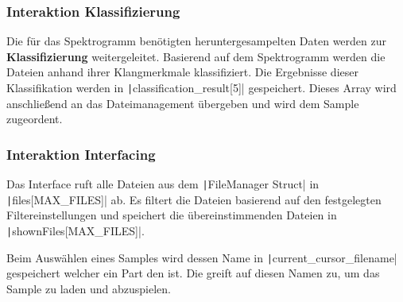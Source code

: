 \subsubsection{Interaktion Klassifizierung} 

Die für das Spektrogramm benötigten heruntergesampelten Daten werden zur \textbf{Klassifizierung} weitergeleitet. Basierend auf dem Spektrogramm werden die Dateien anhand ihrer Klangmerkmale klassifiziert. Die Ergebnisse dieser Klassifikation werden in \texttt|classification_result[5]| gespeichert. Dieses Array wird anschließend an das Dateimanagement übergeben und wird dem Sample zugeordent.

\subsubsection{Interaktion Interfacing}
 
Das Interface ruft alle Dateien aus dem \texttt|FileManager Struct| in \texttt|files[MAX_FILES]| ab. Es filtert die Dateien basierend auf den festgelegten Filtereinstellungen und speichert die übereinstimmenden Dateien in \texttt|shownFiles[MAX_FILES]|.

Beim Auswählen eines Samples wird dessen Name in \texttt|current_cursor_filename| gespeichert welcher ein Part den  ist. Die  greift auf diesen Namen zu, um das Sample zu laden und abzuspielen.

